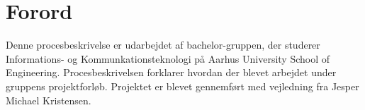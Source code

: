 \chapter{Forord}

Denne procesbeskrivelse er udarbejdet af bachelor-gruppen, der studerer Informations- og Kommunkationsteknologi på Aarhus University School of Engineering. Procesbeskrivelsen forklarer hvordan der blevet arbejdet under gruppens projektforløb. Projektet er blevet gennemført med vejledning fra Jesper Michael Kristensen.